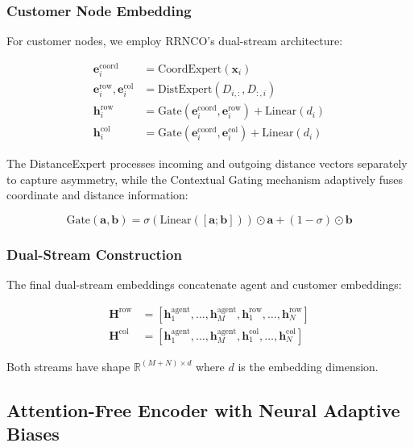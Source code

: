 \documentclass[lettersize,journal]{IEEEtran}
\begin{document}
\subsubsection{Customer Node Embedding}

For customer nodes, we employ RRNCO's dual-stream architecture:

\begin{align}
\mathbf{e}^{\text{coord}}_i &= \text{CoordExpert}(\mathbf{x}_i) \\
\mathbf{e}^{\text{row}}_i, \mathbf{e}^{\text{col}}_i &= \text{DistExpert}(D_{i,:}, D_{:,i}) \\
\mathbf{h}^{\text{row}}_i &= \text{Gate}(\mathbf{e}^{\text{coord}}_i, \mathbf{e}^{\text{row}}_i) + \text{Linear}(d_i) \\
\mathbf{h}^{\text{col}}_i &= \text{Gate}(\mathbf{e}^{\text{coord}}_i, \mathbf{e}^{\text{col}}_i) + \text{Linear}(d_i)
\end{align}

The DistanceExpert processes incoming and outgoing distance vectors separately to capture asymmetry, while the Contextual Gating mechanism adaptively fuses coordinate and distance information:

\begin{equation}
\text{Gate}(\mathbf{a}, \mathbf{b}) = \sigma(\text{Linear}([\mathbf{a}; \mathbf{b}])) \odot \mathbf{a} + (1-\sigma) \odot \mathbf{b}
\end{equation}

\subsubsection{Dual-Stream Construction}

The final dual-stream embeddings concatenate agent and customer embeddings:

\begin{align}
\mathbf{H}^{\text{row}} &= [\mathbf{h}^{\text{agent}}_1, \ldots, \mathbf{h}^{\text{agent}}_M, \mathbf{h}^{\text{row}}_1, \ldots, \mathbf{h}^{\text{row}}_N] \\
\mathbf{H}^{\text{col}} &= [\mathbf{h}^{\text{agent}}_1, \ldots, \mathbf{h}^{\text{agent}}_M, \mathbf{h}^{\text{col}}_1, \ldots, \mathbf{h}^{\text{col}}_N]
\end{align}

Both streams have shape $\mathbb{R}^{(M+N) \times d}$ where $d$ is the embedding dimension.

\subsection{Attention-Free Encoder with Neural Adaptive Biases}
\end{document}
